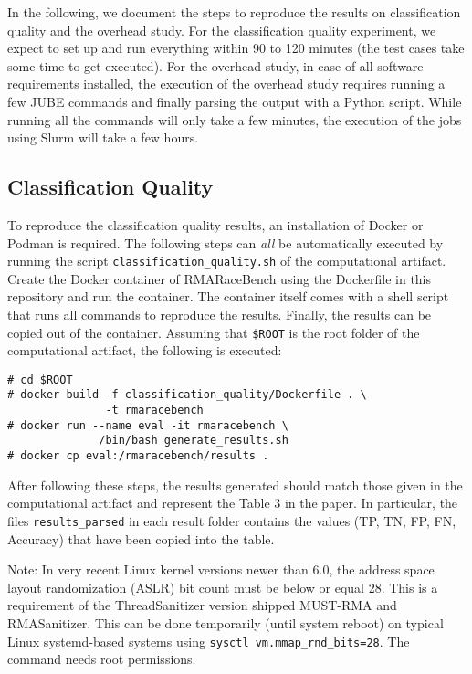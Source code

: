 \documentclass[twoside]{article}
\begin{document}
In the following, we document the steps to reproduce the results on classification quality and the overhead study.
For the classification quality experiment, we expect to set up and run everything within 90 to 120 minutes (the test cases take some time to get executed).
For the overhead study, in case of all software requirements installed, the execution of the overhead study requires running a few JUBE commands and finally parsing the output with a Python script. While running all the commands will only take a few minutes, the execution of the jobs using Slurm will take a few hours.

\subsection*{Classification Quality}
To reproduce the classification quality results, an installation of Docker or Podman is required.
The following steps can \textit{all} be automatically executed by running the script \texttt{classification\_quality.sh} of the computational artifact.
Create the Docker container of RMARaceBench using the Dockerfile in this repository and run the container.
The container itself comes with a shell script that runs all commands to reproduce the results.
Finally, the results can be copied out of the container.
Assuming that \texttt{\$ROOT} is the root folder of the computational artifact, the following is executed:
{
\small
\begin{verbatim}
# cd $ROOT
# docker build -f classification_quality/Dockerfile . \
               -t rmaracebench
# docker run --name eval -it rmaracebench \ 
              /bin/bash generate_results.sh
# docker cp eval:/rmaracebench/results .
\end{verbatim}
}

After following these steps, the results generated should match those given in the computational artifact and represent the Table 3 in the paper.
In particular, the files \texttt{results\_parsed} in each result folder contains the values (TP, TN, FP, FN, Accuracy) that have been copied into the table.

Note: In very recent Linux kernel versions newer than 6.0, the address space layout randomization (ASLR) bit count must be below or equal 28. This is a requirement of the ThreadSanitizer version shipped MUST-RMA and RMASanitizer. This can be done temporarily (until system reboot) on typical Linux systemd-based systems using \texttt{sysctl vm.mmap\_rnd\_bits=28}. The command needs root permissions. 
\end{document}
